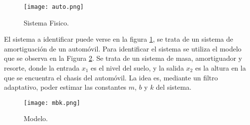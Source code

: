 
\vspace*{\fill}
\begin{figure}[H]
\centering
\texttt{[image: auto.png]}
\caption{Sistema Fisico.}
\label{fig:auto} 
\end{figure}
\vspace*{\fill}

	El sistema a identificar puede verse en la figura \ref{fig:auto}, se trata de un sistema de amortiguación de un automóvil. Para identificar el sistema se utiliza el modelo que se observa en la Figura \ref{fig:mbk}. Se trata de un sistema de masa, amortiguador y resorte, donde la entrada $x_{1}$ es el nivel del suelo, y la salida $x_{2}$ es la altura en la que se encuentra el chasis del automóvil. La idea es, mediante un filtro adaptativo, poder estimar las constantes $m$, $b$ y $k$ del sistema.

\vspace*{\fill}
\begin{figure}[H]
\centering
\texttt{[image: mbk.png]}
\caption{Modelo.}
\label{fig:mbk} 
\end{figure}
\vspace*{\fill}
